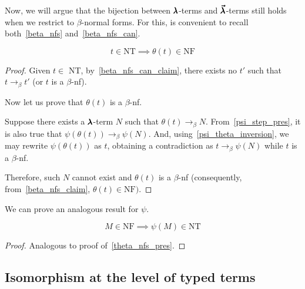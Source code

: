 Now, we will argue that the bijection between $\pmb{\lambda}$-terms and $\pmb{\vec \lambda}$-terms still holds when we restrict to $\beta$-normal forms.
For this, is convenient to recall both~\cref{beta_nfs} and~\cref{beta_nfs_can}.

\begin{theorem}
  \label{theta_nfs_pres}
  \[ t \in \text{NT} \implies \theta(t) \in \text{NF} \]
\end{theorem}
\begin{proof}
  Given $t \in$ NT, by~\cref{beta_nfs_can_claim}, there exists no $t'$ such that $t \to_\beta t'$ (or $t$ is a $\beta$-nf).

  Now let us prove that $\theta(t)$ is a $\beta$-nf.

  Suppose there exists a $\pmb{\lambda}$-term $N$ such that $\theta(t) \to_\beta N$.
  From~\cref{psi_step_pres}, it is also true that $\psi(\theta(t)) \to_\beta \psi(N)$.
  And, using~\cref{psi_theta_inversion}, we may rewrite $\psi(\theta(t))$ as $t$, obtaining a contradiction as $t \to_\beta \psi(N)$ while $t$ is a $\beta$-nf.

  Therefore, such $N$ cannot exist and $\theta(t)$ is a $\beta$-nf (consequently, from~\cref{beta_nfs_claim}, $\theta(t) \in \text{NF})$.
\end{proof}

We can prove an analogous result for $\psi$. 

\begin{theorem}
  \[ M \in \text{NF} \implies \psi(M) \in \text{NT} \]
\end{theorem}
\begin{proof}
  Analogous to proof of~\cref{theta_nfs_pres}.
\end{proof}


\subsection{Isomorphism at the level of typed terms}

